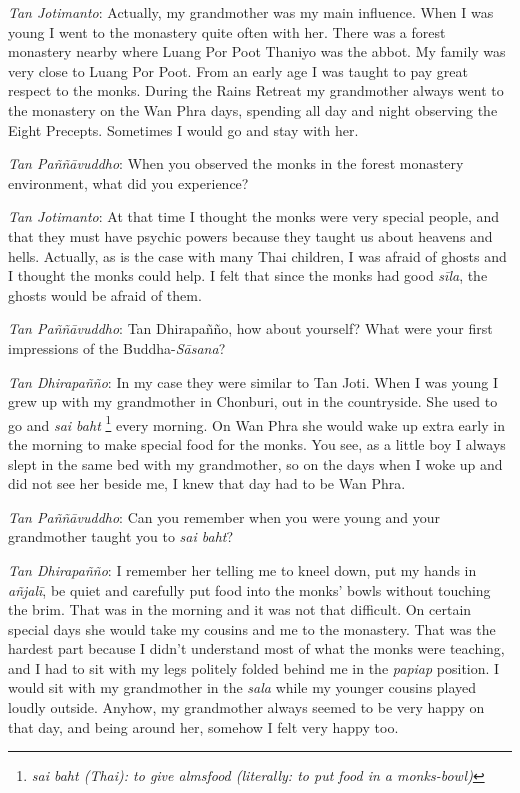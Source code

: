 \emph{Tan Jotimanto}: Actually, my grandmother was my main influence.
When I was young I went to the monastery quite often with her. There was
a forest monastery nearby where Luang Por Poot Thaniyo was the abbot. My
family was very close to Luang Por Poot. From an early age I was taught
to pay great respect to the monks. During the Rains Retreat my
grandmother always went to the monastery on the Wan Phra days, spending
all day and night observing the Eight Precepts. Sometimes I would go and
stay with her.

\emph{Tan Paññāvuddho}‎: When you observed the monks in the forest
monastery environment, what did you experience?

\emph{Tan Jotimanto}: At that time I thought the monks were very special
people, and that they must have psychic powers because they taught us
about heavens and hells. Actually, as is the case with many Thai
children, I was afraid of ghosts and I thought the monks could help. I
felt that since the monks had good \emph{sīla}, the ghosts would be
afraid of them.

\emph{Tan Paññāvuddho}‎: Tan Dhirapañño, how about yourself? What were
your first impressions of the Buddha-\emph{Sāsana}?

\emph{Tan Dhirapañño}: In my case they were similar to Tan Joti. When I
was young I grew up with my grandmother in Chonburi, out in the
countryside. She used to go and \emph{sai baht} \footnote{\emph{sai baht
  (Thai): to give almsfood (literally: to put food in a monks-bowl)}}
every morning. On Wan Phra she would wake up extra early in the morning
to make special food for the monks. You see, as a little boy I always
slept in the same bed with my grandmother, so on the days when I woke up
and did not see her beside me, I knew that day had to be Wan Phra.

\emph{Tan Paññāvuddho}‎: Can you remember when you were young and your
grandmother taught you to \emph{sai baht}?

\emph{Tan Dhirapañño}‎: I remember her telling me to kneel down, put my
hands in \emph{añjalī}, be quiet and carefully put food into the monks'
bowls without touching the brim. That was in the morning and it was not
that difficult. On certain special days she would take my cousins and me
to the monastery. That was the hardest part because I didn't understand
most of what the monks were teaching, and I had to sit with my legs
politely folded behind me in the \emph{papiap} position. I would sit
with my grandmother in the \emph{sala} while my younger cousins played
loudly outside. Anyhow, my grandmother always seemed to be very happy on
that day, and being around her, somehow I felt very happy too.


